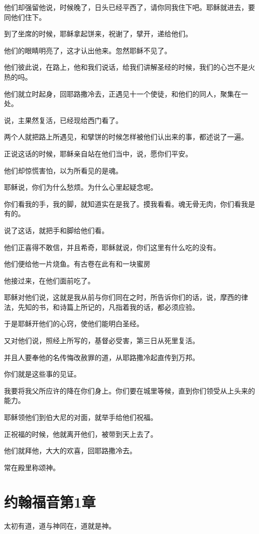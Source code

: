 \documentclass[12pt,oneside]{book}
\begin{document}
他们却强留他说，时候晚了，日头已经平西了，请你同我住下吧。耶稣就进去，要同他们住下。

到了坐席的时候，耶稣拿起饼来，祝谢了，擘开，递给他们。

他们的眼睛明亮了，这才认出他来。忽然耶稣不见了。

他们彼此说，在路上，他和我们说话，给我们讲解圣经的时候，我们的心岂不是火热的吗。

他们就立时起身，回耶路撒冷去，正遇见十一个使徒，和他们的同人，聚集在一处。

说，主果然复活，已经现给西门看了。

两个人就把路上所遇见，和擘饼的时候怎样被他们认出来的事，都述说了一遍。

正说这话的时候，耶稣亲自站在他们当中，说，愿你们平安。

他们却惊慌害怕，以为所看见的是魂。

耶稣说，你们为什么愁烦。为什么心里起疑念呢。

你们看我的手，我的脚，就知道实在是我了。摸我看看。魂无骨无肉，你们看我是有的。

说了这话，就把手和脚给他们看。

他们正喜得不敢信，并且希奇，耶稣就说，你们这里有什么吃的没有。

他们便给他一片烧鱼。有古卷在此有和一块蜜房

他接过来，在他们面前吃了。

耶稣对他们说，这就是我从前与你们同在之时，所告诉你们的话，说，摩西的律法，先知的书，和诗篇上所记的，凡指着我的话，都必须应验。

于是耶稣开他们的心窍，使他们能明白圣经。

又对他们说，照经上所写的，基督必受害，第三日从死里复活。

并且人要奉他的名传悔改赦罪的道，从耶路撒冷起直传到万邦。

你们就是这些事的见证。

我要将我父所应许的降在你们身上。你们要在城里等候，直到你们领受从上头来的能力。

耶稣领他们到伯大尼的对面，就举手给他们祝福。

正祝福的时候，他就离开他们，被带到天上去了。

他们就拜他，大大的欢喜，回耶路撒冷去。

常在殿里称颂神。

\chapter{约翰福音第1章}
太初有道，道与神同在，道就是神。
\end{document}
